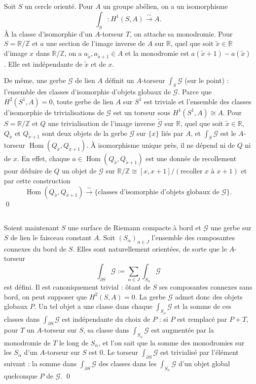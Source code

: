 \documentclass[12pt,a4paper]{article}
\theoremstyle{plain}
\theoremstyle{definition}
\theoremstyle{remark}
\DeclareMathOperator{\Hom}{Hom}
\newcommand{\Z}{\mathbb{Z}}
\newcommand{\R}{\mathbb{R}}
\providecommand{\Hom}{\operatorname{Hom}}
\providecommand{\R}{\mathrm{R}}
\begin{document}
\subsection{}

Soit $S$ un cercle orienté. Pour $A$ un groupe abélien, on a un isomorphisme
\[
\int_S : H^1(S, A) \xrightarrow{\sim} A.
\]
À la classe d'isomorphie d'un $A$-torseur $T$, on attache sa monodromie. Pour $S = \R/\Z$ et
$a$ une section de l'image inverse de $A$ sur $\R$, quel que soit $\tilde{x} \in \R$ d'image $x$ dans $\R/\Z$,
on a $a_{\tilde{x}}, a_{\tilde{x}+1} \in A$ et la monodromie est $a(\tilde{x} + 1) - a(\tilde{x})$. Elle est indépendante de $\tilde{x}$
et de $x$.

De même, une gerbe $\mathscr{G}$ de lien $A$ définit un $A$-torseur $\int_S \mathscr{G}$ (sur le point) : l'ensemble
des classes d'isomorphie d'objets globaux de $\mathscr{G}$. Parce que $H^2(S^1, A) = 0$, toute gerbe
de lien $A$ sur $S^1$ est triviale et l'ensemble des classes d'isomorphie de trivialisations de $\mathscr{G}$
est un torseur sous $H^1(S^1, A) \cong A$. Pour $S = \R/\Z$ et $Q$ une trivialisation de l'image
inverse $\tilde{\mathscr{G}}$ sur $\R$, quel que soit $\tilde{x} \in \R$, $Q_{\tilde{x}}$ et $Q_{\tilde{x}+1}$ sont deux objets de la gerbe $\mathscr{G}$ sur
$\{x\}$ liés par $A$, et $\int_S \mathscr{G}$ est le $A$-torseur $\Hom(Q_{\tilde{x}}, Q_{\tilde{x}+1})$. À isomorphisme unique près,
il ne dépend ni de $Q$ ni de $x$. En effet, chaque $a \in \Hom(Q_{\tilde{x}}, Q_{\tilde{x}+1})$ est une donnée de
recollement pour déduire de $Q$ un objet de $\mathscr{G}$ sur $\R/\Z \cong [x, x+1]/(\text{recoller } x \text{ à } x+1)$
et par cette construction
\[
\Hom(Q_{\tilde{x}}, Q_{\tilde{x}+1}) \xrightarrow{\sim} \{\text{classes d'isomorphie d'objets globaux de } \mathscr{G}\}.
\]
\qed

\subsection{}

Soient maintenant $S$ une surface de Riemann compacte à bord et $\mathscr{G}$ une gerbe
sur $S$ de lien le faisceau constant $A$. Soit $(S_\alpha)_{\alpha \in J}$ l'ensemble des composantes connexes
du bord de $S$. Elles sont naturellement orientées, de sorte que le $A$-torseur
\[
\int_{\partial S} \mathscr{G} := \sum_{\alpha \in J} \int_{S_\alpha} \mathscr{G}
\]
est défini. Il est canoniquement trivial : ôtant de $S$ ses composantes connexes sans bord,
on peut supposer que $H^2(S, A) = 0$. La gerbe $\mathscr{G}$ admet donc des objets globaux $P$. Un
tel objet a une classe dans chaque $\int_{S_\alpha} \mathscr{G}$ et la somme de ces classes dans $\int_{\partial S} \mathscr{G}$ est
indépendante du choix de $P$ : si $P$ est remplacé par $P + T$, pour $T$ un $A$-torseur sur $S$,
sa classe dans $\int_{S_\alpha} \mathscr{G}$ est augmentée par la monodromie de $T$ le long de $S_\alpha$, et l'on sait
que la somme des monodromies sur les $S_\alpha$ d'un $A$-torseur sur $S$ est $0$. Le torseur $\int_{\partial S} \mathscr{G}$
est trivialisé par l'élément suivant : la somme dans $\int_{\partial S} \mathscr{G}$ des classes dans les $\int_{S_\alpha} \mathscr{G}$
d'un objet global quelconque $P$ de $\mathscr{G}$.
\qed
\end{document}
